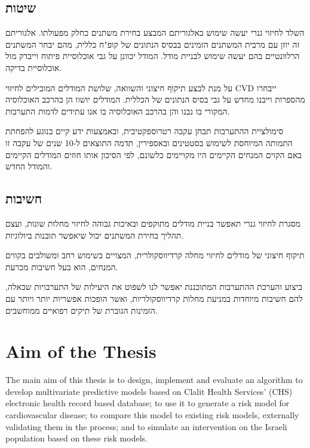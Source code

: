 \documentclass[a4paper,12pt]{article}
\begin{document}
\begin{hebrew}
		\subsection*{שיטות}
				השלד לחיזוי גנרי יעשה שימוש באלגוריתם המבצע בחירת משתנים כחלק מפעולתו. אלגוריתם זה יוזן עם מרבית המשתנים הזמינים בבסיס הנתונים של קופ"ח כללית, מהם יבחר המשתנים הרלוונטיים בהם יעשה שימוש לבניית מודל. המודל יכוונן על גבי אוכלוסיית פיתוח וייבדק מול אוכלוסיית בדיקה.
		
		על מנת לבצע תיקוף חיצוני והשוואה, שלושת המודלים המובילים לחיזוי CVD ייבחרו מהספרות וייבנו מחדש על גבי בסיס הנתונים של הכללית. המודלים יושוו הן בהרכב האוכלוסיה המקורי בו נבנו והן בהרכב האוכלוסיה בו אנו עתידים לדמות התערבות.
		
		סימולציית ההתערבות תבחן עקבה רטרוספקטיבית, ובאמצעות ידע קיים בנוגע להפחתת התמותה המיוחסת לשימוש בסטטינים ובאספירין, תדמה התוצאים ל-10 שנים  של עקבה זו  באם הקוים המנחים הקיימים היו מקויימים כלשונם, לפי הסיכון אותו חוזים המודלים הקיימים והמודל החדש.
		
		
		\subsection*{חשיבות}
		מסגרת לחיזוי גנרי תאפשר בניית מודלים מתוקפים ובאיכות גבוהה לחיזוי מחלות שונות, ועצם תהליך בחירת המשתנים יכול שיאפשר תובנות ביולוגיות.
		
		תיקוף חיצוני של מודלים לחיזוי מחלה קרדיווסקולרית, המצויים בשימוש רחב ומשולבים בקווים המנחים, הוא בעל חשיבות מכרעת\cite{Collins2015}.
		
			ביצוע והערכת ההתערבות המתוכננת יאפשר לנו לשפוט את היעילות של התערבויות שכאלה, להם חשיבות מיוחדות במניעת מחלות קרדיווסקולריות\cite{Riegel2017}, ואשר הופכות אפשריות יותר ויותר עם הזמינות הגוברת של תיקים רפואיים ממוחשבים.
		
	\end{hebrew}
	
	\section{Aim of the Thesis}
	The main aim of this thesis is to design, implement and evaluate an algorithm to develop multivariate predictive models based on Clalit Health Services' (CHS) electronic health record based database; to use it to generate a risk model for cardiovascular disease; to compare this model to existing risk models, externally validating them in the process; and to simulate an intervention on the Israeli population based on these risk models.
	
\end{document}
